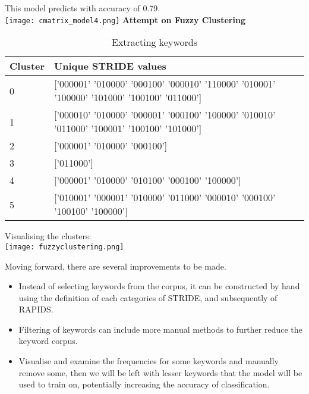 This model predicts with accuracy of 0.79.\\
\texttt{[image: cmatrix\_model4.png]}
\clearpage
\textbf{Attempt on Fuzzy Clustering}\\
\begin{table}[h]
    \caption{Extracting keywords}
    \label{crouch}
    \begin{tabularx}{\textwidth}{p{}X}
        \toprule
        \textbf{Cluster} & \textbf{Unique STRIDE values} \\
        \midrule
        0 &
        ['000001' '010000' '000100' '000010' '110000' '010001' '100000' '101000' '100100' '011000'] \\
        \midrule
        1 &
        ['000010' '010000' '000001' '000100' '100000' '010010' '011000' '100001' '100100' '101000'] \\
        \midrule
        2 &
        ['000001' '010000' '000100'] \\
        \midrule
        3 &
        ['011000'] \\
        4 &
        ['000001' '010000' '010100' '000100' '100000'] \\
        5 &
        ['010001' '000001' '010000' '011000' '000010' '000100' '100100' '100000'] \\
        \bottomrule
    \end{tabularx}
\end{table}

Visualising the clusters:\\
\texttt{[image: fuzzyclustering.png]}

\vspace*{10pt}
Moving forward, there are several improvements to be made.
\begin{itemize}
    \item Instead of selecting keywords from the corpus, it can be constructed by hand using the definition of each categories of STRIDE, and subsequently of RAPIDS.
    \item Filtering of keywords can include more manual methods to further reduce the keyword corpus.
    \item Visualise and examine the frequencies for some keywords and manually remove some, then we will be left with lesser keywords that the model will be used to train on, potentially increasing the accuracy of classification.
\end{itemize}